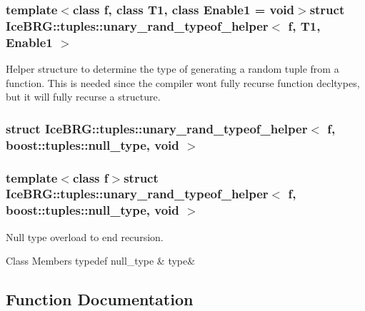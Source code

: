 \subsubsection*{template$<$class f, class T1, class Enable1 = void$>$struct Ice\+B\+R\+G\+::tuples\+::unary\+\_\+rand\+\_\+typeof\+\_\+helper$<$ f, T1, Enable1 $>$}

Helper structure to determine the type of generating a random tuple from a function. This is needed since the compiler won\textquotesingle{}t fully recurse function decltypes, but it will fully recurse a structure. \label{structIceBRG_1_1tuples_1_1unary__rand__typeof__helper_3_01f_00_01boost_1_1tuples_1_1null__type_00_01void_01_4}
\hypertarget{namespaceIceBRG_1_1tuples_structIceBRG_1_1tuples_1_1unary__rand__typeof__helper_3_01f_00_01boost_1_1tuples_1_1null__type_00_01void_01_4}{}
\subsubsection{struct Ice\+B\+R\+G\+:\+:tuples\+:\+:unary\+\_\+rand\+\_\+typeof\+\_\+helper$<$ f, boost\+:\+:tuples\+:\+:null\+\_\+type, void $>$}
\subsubsection*{template$<$class f$>$struct Ice\+B\+R\+G\+::tuples\+::unary\+\_\+rand\+\_\+typeof\+\_\+helper$<$ f, boost\+::tuples\+::null\+\_\+type, void $>$}

Null type overload to end recursion. \begin{DoxyFields}{Class Members}
\hypertarget{namespaceIceBRG_1_1tuples_a797e7251aa26c898d15325e9892931f5}{}typedef null\+\_\+type\label{namespaceIceBRG_1_1tuples_a797e7251aa26c898d15325e9892931f5}
&
type&
\\
\hline

\end{DoxyFields}


\subsection{Function Documentation}
\hypertarget{namespaceIceBRG_1_1tuples_ac21b3a3433cc3c2ee33c4950b92689e6}{}
